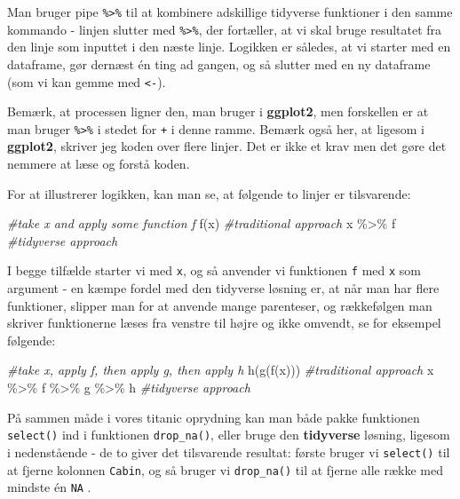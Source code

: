 \documentclass[
]{book}
\newenvironment{Shaded}{\begin{snugshade}}{\end{snugshade}}
\newcommand{\CommentTok}[1]{\textcolor[rgb]{0.56,0.35,0.01}{\textit{#1}}}
\newcommand{\FunctionTok}[1]{\textcolor[rgb]{0.00,0.00,0.00}{#1}}
\newcommand{\NormalTok}[1]{#1}
\newcommand{\SpecialCharTok}[1]{\textcolor[rgb]{0.00,0.00,0.00}{#1}}
\begin{document}
Man bruger pipe \texttt{\%\textgreater{}\%} til at kombinere adskillige tidyverse funktioner i den samme kommando - linjen slutter med \texttt{\%\textgreater{}\%}, der fortæller, at vi skal bruge resultatet fra den linje som inputtet i den næste linje. Logikken er således, at vi starter med en dataframe, gør dernæst én ting ad gangen, og så slutter med en ny dataframe (som vi kan gemme med \texttt{\textless{}-}).

Bemærk, at processen ligner den, man bruger i \textbf{ggplot2}, men forskellen er at man bruger \texttt{\%\textgreater{}\%} i stedet for \texttt{+} i denne ramme. Bemærk også her, at ligesom i \textbf{ggplot2}, skriver jeg koden over flere linjer. Det er ikke et krav men det gøre det nemmere at læse og forstå koden.

For at illustrerer logikken, kan man se, at følgende to linjer er tilsvarende:

\begin{Shaded}
\begin{Highlighting}[]
\CommentTok{\#take x and apply some function f}
\FunctionTok{f}\NormalTok{(x)    }\CommentTok{\#traditional approach}
\NormalTok{x }\SpecialCharTok{\%\textgreater{}\%}\NormalTok{ f }\CommentTok{\#tidyverse approach}
\end{Highlighting}
\end{Shaded}

I begge tilfælde starter vi med \texttt{x}, og så anvender vi funktionen \texttt{f} med \texttt{x} som argument - en kæmpe fordel med den tidyverse løsning er, at når man har flere funktioner, slipper man for at anvende mange parenteser, og rækkefølgen man skriver funktionerne læses fra venstre til højre og ikke omvendt, se for eksempel følgende:

\begin{Shaded}
\begin{Highlighting}[]
\CommentTok{\#take x, apply f, then apply g, then apply h}
\FunctionTok{h}\NormalTok{(}\FunctionTok{g}\NormalTok{(}\FunctionTok{f}\NormalTok{(x)))          }\CommentTok{\#traditional approach}
\NormalTok{x }\SpecialCharTok{\%\textgreater{}\%}\NormalTok{ f }\SpecialCharTok{\%\textgreater{}\%}\NormalTok{ g }\SpecialCharTok{\%\textgreater{}\%}\NormalTok{ h }\CommentTok{\#tidyverse approach}
\end{Highlighting}
\end{Shaded}

På sammen måde i vores titanic oprydning kan man både pakke funktionen \texttt{select()} ind i funktionen \texttt{drop\_na()}, eller bruge den \textbf{tidyverse} løsning, ligesom i nedenstående - de to giver det tilsvarende resultat: første bruger vi \texttt{select()} til at fjerne kolonnen \texttt{Cabin}, og så bruger vi \texttt{drop\_na()} til at fjerne alle række med mindste én \texttt{NA} .
\end{document}
